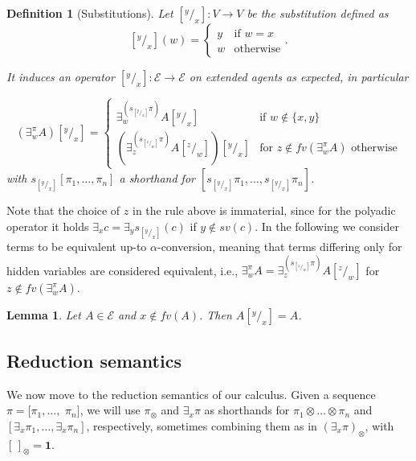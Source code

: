\documentclass[preprint,12pt]{elsarticle}
\newtheorem{definition}{Definition}
\newtheorem{lemma}{Lemma}
\def\1{{\mathbf 1}}
\newcommand{\tell}{{\bf tell}}
\newcommand{\ask}{{\bf ask}}
\newcommand{\ostop}{{\bf stop}}
\newcommand{\rarrow}{\rightarrow}
\def\1{{\mathbf 1}}
\begin{document}
\begin{definition}[Substitutions]
	Let $[^y/_x]: V \to V$ be the substitution defined as
	\[ [^y/_x](w) = 
	\begin{cases} 
	y & \text{if $w = x$} \\
	w & \text{otherwise}
	\end{cases}. \]
	
	It induces an operator $[^y/_x]: \mathcal{E} \rarrow \mathcal{E}$ on extended agents as expected,  in particular
	
	$$(\exists^{\pi}_w A)[^y/_x] = \begin{cases} 
	\exists^{(s_{[^y/_x]} \pi)}_w A[^y/_x]  & \text{if } w \not \in \{x, y\} \\
	(\exists^{(s_{[^z/_w]} \pi)}_z A[^z/_w])[^y/_x] & \text{for } z \not \in fv(\exists^{\pi}_w A) \text{ otherwise}
	\end{cases}$$
	with $s_{[^y/_x]} [ \pi_1, \ldots, \pi_n ]$ a shorthand for $[s_{[^y/_x]} \pi_1, \ldots, s_{[^y/_x]} \pi_n]$.
\end{definition}

Note that the choice of $z$ in the rule above is immaterial, since for the polyadic operator it holds
$\exists_x c = \exists_y s_{[^y/_x]}(c)$ if $y \not \in sv(c)$.
%
In the following we consider terms to be equivalent up-to $\alpha$-conversion, meaning that terms 
differing only for hidden variables are considered equivalent, i.e.,
$\exists_w^\pi A = \exists_z^{(s_{[^z/_w]}\pi)} A[^z/_w]$ for $z \not \in fv(\exists^{\pi}_w A)$.

\begin{lemma}
	Let $A \in \mathcal{E}$ and $x \not \in fv(A)$. Then $A[^y/_x] = A$.
\end{lemma}


\subsection{Reduction semantics}
We now move to the reduction semantics of our calculus. 
%
Given a sequence $\pi = [\pi_1, \ldots,$ $\pi_n]$, we will use 
$\pi_\otimes$ and $\exists_x \pi$
as shorthands for $\pi_1 \otimes \ldots \otimes \pi_n$ and
$[\exists_x \pi_1, \ldots, \exists_x \pi_n]$, respectively,
sometimes combining them as in $(\exists_x \pi)_\otimes$,
with $[\,]_\otimes = \1$.
\end{document}
